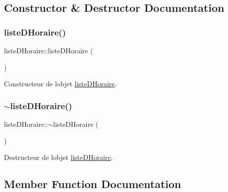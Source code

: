 \subsection{Constructor \& Destructor Documentation}
\hypertarget{classliste_d_horaire_a614fd89aa8fb95f9068613fc1974f307}{}\label{classliste_d_horaire_a614fd89aa8fb95f9068613fc1974f307} 
\subsubsection{\texorpdfstring{liste\+D\+Horaire()}{listeDHoraire()}}
{\footnotesize\ttfamily liste\+D\+Horaire\+::liste\+D\+Horaire (\begin{DoxyParamCaption}{ }\end{DoxyParamCaption})}



Constructeur de l\textquotesingle{}objet \hyperlink{classliste_d_horaire}{liste\+D\+Horaire}. 

\hypertarget{classliste_d_horaire_a497a28a7b80534317d7ec387d4c8714b}{}\label{classliste_d_horaire_a497a28a7b80534317d7ec387d4c8714b} 
\subsubsection{\texorpdfstring{$\sim$liste\+D\+Horaire()}{~listeDHoraire()}}
{\footnotesize\ttfamily liste\+D\+Horaire\+::$\sim$liste\+D\+Horaire (\begin{DoxyParamCaption}{ }\end{DoxyParamCaption})}



Destructeur de l\textquotesingle{}objet \hyperlink{classliste_d_horaire}{liste\+D\+Horaire}. 



\subsection{Member Function Documentation}
\hypertarget{classliste_d_horaire_a30f35985eb14300ad9cf8f44ef9d651e}{}\label{classliste_d_horaire_a30f35985eb14300ad9cf8f44ef9d651e} 
